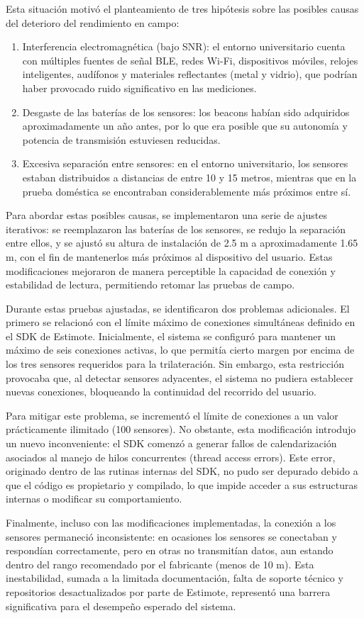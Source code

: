 Esta situación motivó el planteamiento de tres hipótesis sobre las posibles causas del deterioro del rendimiento en campo:
\begin{enumerate}
	\item	Interferencia electromagnética (bajo SNR): el entorno universitario cuenta con múltiples fuentes de señal BLE, redes Wi-Fi, dispositivos móviles, relojes inteligentes, audífonos y materiales reflectantes (metal y vidrio), que podrían haber provocado ruido significativo en las mediciones.
	\item	Desgaste de las baterías de los sensores: los beacons habían sido adquiridos aproximadamente un año antes, por lo que era posible que su autonomía y potencia de transmisión estuviesen reducidas.
	\item	Excesiva separación entre sensores: en el entorno universitario, los sensores estaban distribuidos a distancias de entre 10 y 15 metros, mientras que en la prueba doméstica se encontraban considerablemente más próximos entre sí.
\end{enumerate}

Para abordar estas posibles causas, se implementaron una serie de ajustes iterativos: se reemplazaron las baterías de los sensores, se redujo la separación entre ellos, y se ajustó su altura de instalación de 2.5 m a aproximadamente 1.65 m, con el fin de mantenerlos más próximos al dispositivo del usuario. Estas modificaciones mejoraron de manera perceptible la capacidad de conexión y estabilidad de lectura, permitiendo retomar las pruebas de campo.

Durante estas pruebas ajustadas, se identificaron dos problemas adicionales. El primero se relacionó con el límite máximo de conexiones simultáneas definido en el SDK de Estimote. Inicialmente, el sistema se configuró para mantener un máximo de seis conexiones activas, lo que permitía cierto margen por encima de los tres sensores requeridos para la trilateración. Sin embargo, esta restricción provocaba que, al detectar sensores adyacentes, el sistema no pudiera establecer nuevas conexiones, bloqueando la continuidad del recorrido del usuario.

Para mitigar este problema, se incrementó el límite de conexiones a un valor prácticamente ilimitado (100 sensores). No obstante, esta modificación introdujo un nuevo inconveniente: el SDK comenzó a generar fallos de calendarización asociados al manejo de hilos concurrentes (thread access errors). Este error, originado dentro de las rutinas internas del SDK, no pudo ser depurado debido a que el código es propietario y compilado, lo que impide acceder a sus estructuras internas o modificar su comportamiento.

Finalmente, incluso con las modificaciones implementadas, la conexión a los sensores permaneció inconsistente: en ocasiones los sensores se conectaban y respondían correctamente, pero en otras no transmitían datos, aun estando dentro del rango recomendado por el fabricante (menos de 10 m). Esta inestabilidad, sumada a la limitada documentación, falta de soporte técnico y repositorios desactualizados por parte de Estimote, representó una barrera significativa para el desempeño esperado del sistema.
